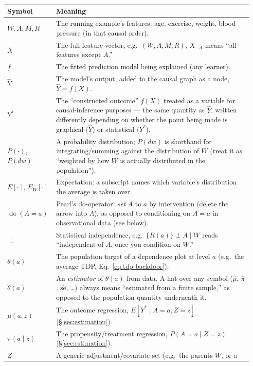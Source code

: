 \begin{longtable}{@{}p{3.0cm}p{10.2cm}@{}}
\toprule
\textbf{Symbol} & \textbf{Meaning} \\
\midrule
\endhead
$W, A, M, R$ & The running example's features: age, exercise, weight,
  blood pressure (in that causal order). \\
$X$ & The full feature vector, e.g.\ $(W,A,M,R)$; $X_{-A}$ means ``all
  features except $A$.'' \\
$f$ & The fitted prediction model being explained (any learner). \\
$\hat Y$ & The model's output, added to the causal graph as a node,
  $\hat Y = f(X)$. \\
$Y^*$ & The ``constructed outcome'' $f(X)$ treated as a variable for
  causal-inference purposes --- the same quantity as $\hat Y$, written
  differently depending on whether the point being made is graphical
  ($\hat Y$) or statistical ($Y^*$). \\
$P(\cdot)$, $P(dw)$ & A probability distribution; $P(dw)$ is shorthand for
  integrating/summing against the distribution of $W$ (treat it as
  ``weighted by how $W$ is actually distributed in the population''). \\
$E[\cdot]$, $E_W[\cdot]$ & Expectation; a subscript names which variable's
  distribution the average is taken over. \\
$\operatorname{do}(A=a)$ & Pearl's do-operator: \emph{set} $A$ to $a$ by
  intervention (delete the arrow into $A$), as opposed to conditioning on
  $A=a$ in observational data (see below). \\
$\perp$ & Statistical independence, e.g.\ $\{R(a)\}\perp A \mid W$ reads
  ``independent of $A$, once you condition on $W$.'' \\
$\theta(a)$ & The population target of a dependence plot at level $a$
  (e.g.\ the average TDP, Eq.~\ref{eq:tdp-backdoor}). \\
$\hat\theta(a)$ & An \emph{estimator} of $\theta(a)$ from data. A hat over
  any symbol ($\hat\mu$, $\hat\pi$, $\hat{\mathrm{se}}$, \dots) always means
  ``estimated from a finite sample,'' as opposed to the population quantity
  underneath it. \\
$\mu(a,z)$ & The outcome regression, $E[Y^* \mid A=a, Z=z]$
  (\S\ref{sec:estimation}). \\
$\pi(a\mid z)$ & The propensity/treatment regression, $P(A=a\mid Z=z)$
  (\S\ref{sec:estimation}). \\
$Z$ & A generic adjustment/covariate set (e.g.\ the parents $W$, or a

\end{longtable}
